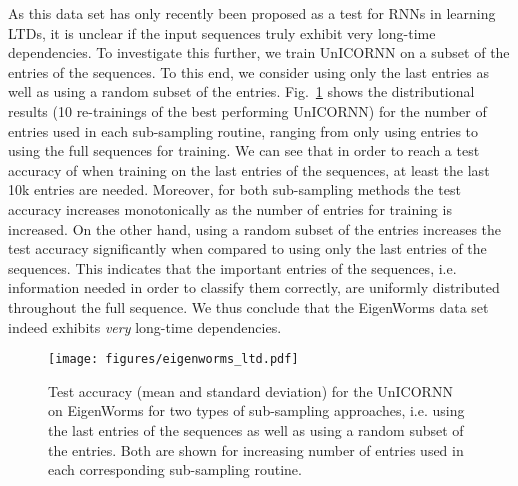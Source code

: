 \documentclass{article}
\newcommand{\fref}[1] {Fig.~\ref{#1}}
\begin{document}
\par As this data set has only recently been proposed as a test for RNNs in learning LTDs, it is unclear if the input sequences truly exhibit very long-time dependencies. To investigate this further, we train UnICORNN on a subset of the entries of the sequences. To this end, we consider using only the last entries as well as using a random subset of the entries. \fref{fig:worms} shows the distributional results (10 re-trainings of the best performing UnICORNN) for the number of entries used in each sub-sampling routine, ranging from only using  entries to using the full sequences for training. We can see that in order to reach a test accuracy of  when training on the last entries of the sequences, at least the last 10k entries are needed. Moreover, for both sub-sampling methods the test accuracy increases monotonically as the number of entries for training is increased. On the other hand, using a random subset of the entries increases the test accuracy significantly when compared to using only the last entries of the sequences. This indicates that the important entries of the sequences, i.e. information needed in order to classify them correctly, are uniformly distributed throughout the full sequence. We thus conclude that the EigenWorms data set indeed exhibits \emph{very} long-time dependencies.

\begin{figure}[ht]
\vskip 0.2in
\begin{center}
\centerline{\texttt{[image: figures/eigenworms\_ltd.pdf]}}
\caption{Test accuracy (mean and standard deviation) for the UnICORNN on EigenWorms for two types of sub-sampling approaches, i.e. using the last entries of the sequences as well as using a random subset of the entries. Both are shown for increasing number of entries used in each corresponding sub-sampling routine.}
\label{fig:worms}
\end{center}
\vskip -0.2in
\end{figure}
\end{document}
